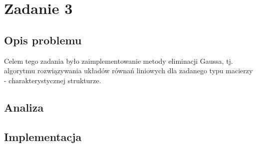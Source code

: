 \section{Zadanie 3}
\subsection{Opis problemu}
Celem tego zadania było zaimplementowanie metody eliminacji Gaussa, tj. algorytmu rozwiązywania układów równań liniowych dla zadanego typu macierzy - charakterystycznej strukturze. \\
\subsection{Analiza}

\subsection{Implementacja}
